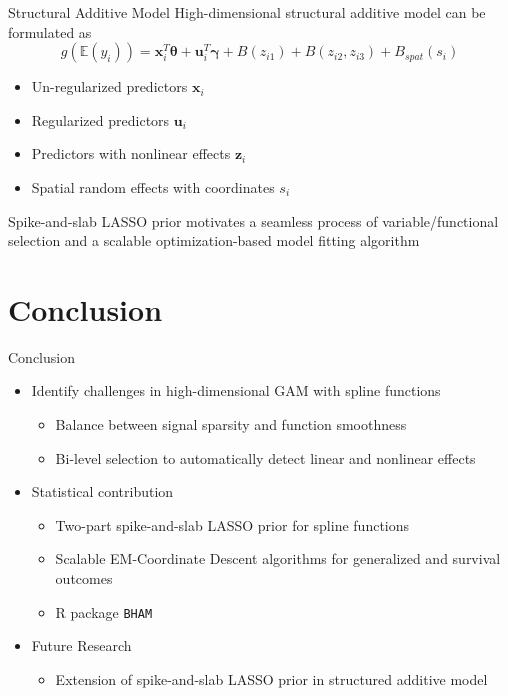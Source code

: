\documentclass[
  ignorenonframetext,
  aspectratio=169]{beamer}
\providecommand{\tightlist}{%
  \setlength{\itemsep}{0pt}\setlength{\parskip}{0pt}}
\newcommand{\bs}[1]{\boldsymbol{#1}}
\begin{document}
\begin{frame}{Structural Additive Model}
\protect\hypertarget{structural-additive-model}{}
High-dimensional structural additive model can be formulated as \[
g(\mathbb{E}(y_i)) = \bs x_i^T \bs \theta + \bs u_i^T \bs \gamma + B(z_{i1}) + B(z_{i2}, z_{i3}) + B_{spat}(s_i)
\]

\begin{itemize}
\tightlist
\item
  Un-regularized predictors \(\bs x_i\)
\item
  Regularized predictors \(\bs u_i\)
\item
  Predictors with nonlinear effects \(\bs z_i\)
\item
  Spatial random effects with coordinates \(s_i\)
\end{itemize}

Spike-and-slab LASSO prior motivates a seamless process of
variable/functional selection and a scalable optimization-based model
fitting algorithm
\end{frame}

\hypertarget{conclusion}{%
\section{Conclusion}\label{conclusion}}

\begin{frame}[fragile]{Conclusion}
\begin{itemize}
\tightlist
\item
  Identify challenges in high-dimensional GAM with spline functions

  \begin{itemize}
  \tightlist
  \item
    Balance between signal sparsity and function smoothness
  \item
    Bi-level selection to automatically detect linear and nonlinear
    effects
  \end{itemize}
\item
  Statistical contribution

  \begin{itemize}
  \tightlist
  \item
    Two-part spike-and-slab LASSO prior for spline functions
  \item
    Scalable EM-Coordinate Descent algorithms for generalized and
    survival outcomes
  \item
    R package \texttt{BHAM}
  \end{itemize}
\item
  Future Research

  \begin{itemize}
  \tightlist
  \item
    Extension of spike-and-slab LASSO prior in structured additive model
  \end{itemize}
\end{itemize}
\end{frame}
\end{document}
